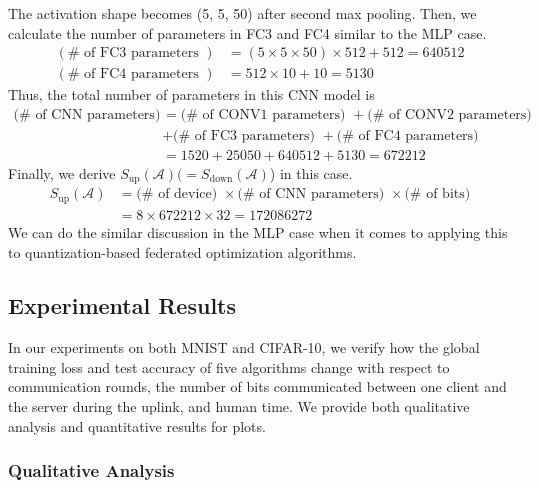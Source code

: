 The activation shape becomes (5, 5, 50) after second max pooling. Then, we calculate the number of parameters in FC3 and FC4 similar to the MLP case.
\begin{align*}
    (\# \textrm{ of FC3 parameters }) &= (5 \times 5 \times 50) \times 512 + 512 = 640512 \\
    (\# \textrm{ of FC4 parameters }) &= 512 \times 10 + 10 = 5130
\end{align*}
Thus, the total number of parameters in this CNN model is
\begin{align*}
    (\# \textrm{ of CNN parameters) } &= (\# \textrm{ of CONV1 parameters) } + (\# \textrm{ of CONV2 parameters) } \\
    &+ (\# \textrm{ of FC3 parameters) } + (\# \textrm{ of FC4 parameters) } \\
    &= 1520 + 25050 + 640512 + 5130 = 672212
\end{align*}
Finally, we derive $S_\textrm{up}(\mathcal{A}) (= S_\textrm{down}(\mathcal{A})$) in this case.
\begin{align*}
    S_\textrm{up}(\mathcal{A}) &= (\# \textrm{ of device) } \times (\# \textrm{ of CNN parameters) } \times (\# \textrm{ of bits)} \\
    &= 8 \times 672212 \times 32 = 172086272
\end{align*}
We can do the similar discussion in the MLP case when it comes to applying this to quantization-based federated optimization algorithms.

\subsection{Experimental Results}
\label{experimental_results}

In our experiments on both MNIST and CIFAR-10, we verify how the global training loss and test accuracy of five algorithms change with respect to communication rounds, the number of bits communicated between one client and the server during the uplink, and human time. We provide both qualitative analysis and quantitative results for plots.

\subsubsection{Qualitative Analysis}
\label{qualitative_analysis}

